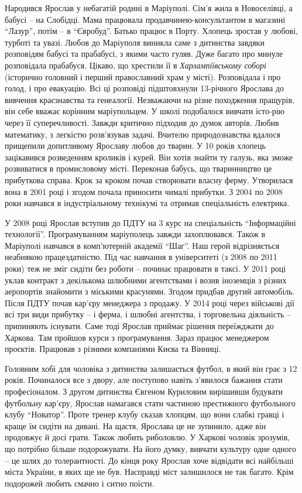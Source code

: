Народився Ярослав у небагатій родині в Маріуполі. Сім'я жила в Новоселівці, а
бабусі – на Слобідці. Мама працювала продавчинею-консультантом в магазині
\enquote{Лазур}, потім – в \enquote{Євробуд}. Батько працює в Порту. Хлопець зростав у любові,
турботі та увазі. Любов до Маріуполя виникла саме з дитинства завдяки
розповідям бабусі та прабабусі, з якими часто гуляв. Дуже багато про минуле
розповідала прабабуся. Цікаво, що хрестили її в \emph{Харлампіївському соборі}
(історично головний і перший  православний храм у місті). Розповідала і про
голод, і про евакуацію.  Всі ці розповіді підштовхнули 13-річного Ярослава до
вивчення краєзнавства та генеалогії. Незважаючи на різне походження пращурів,
він себе вважає корінним маріупольцем.  У школі подобалося вивчати істо\hyp{}рію
через її суперечливості. Завжди критично підходив до думок авторів. Любив
математику, з легкістю розв'язував задачі. Вчителю природознавства вдалося
прищепили допитливому Ярославу  любов до тварин. У 10 років хлопець зацікавився
розведенням кроликів і курей. Він хотів знайти ту галузь, яка зможе розвиватися
в промисловому місті. Переконав бабусь, що тваринництво це прибуткова справа.
Крок за кроком почав створювати власну ферму. Утворилася вона в 2001 році і
згодом почала приносити чималі прибутки. З 2004 по 2008 роки навчався в
індустріальному технікумі та отримав спеціальність електрика.

У 2008 році Ярослав вступив до ПДТУ на 3 курс на спеціальність \enquote{Інформаційні
технології}. Програмуванням маріуполець завжди захоплювався. Також в Маріуполі
навчався в комп'ютерній академії \enquote{Шаг}. Наш герой відрізняється неабиякою
працездатністю. Під час навчання в  університеті (з 2008 по 2011 роки) теж не
зміг сидіти без роботи – починає працювати в таксі. У 2011 році уклав контракт
з декількома шлюбними агентствами і возив іноземців з різних аеропортів
знайомити з міськими красунями. Згодом придбав другий   автомобіль. Після ПДТУ
почав кар'єру менеджера з продажу. У 2014 році через військові дії всі три види
прибутку – і ферма, і шлюбні агентства, і торговельна діяльність – припиняють
існувати. Саме тоді Ярослав приймає рішення переїжджати до Харкова. Там пройшов
курси з програмування. Зараз працює менеджером проєктів. Працював з різними
компаніями Києва та Вінниці.

Головним хобі для чоловіка з дитинства залишається футбол, в який він грає з 12
років. Починалося все з двору, але поступово навіть з'явилося бажання стати
професіоналом. З другом дитинства Євгеном Куриловим вирішивши будувати
футбольну кар'єру, Ярослав намагався стати частиною престижного футбольного
клубу \enquote{Новатор}. Проте тренер клубу сказав хлопцям, що вони  слабкі гравці і
краще їм сидіти на дивані. На щастя, Ярослава це не зупинило, адже він
продовжує й досі грати. Також любить риболовлю. У Харкові чоловік зрозумів, що
потрібно більше подорожувати. На його думку, вивчати культуру одне одного – це
шлях до толерантності. До кінця року Ярослав  хоче відвідати всі найбільші
міста України, в яких ще не був. Насправді міст залишилося не так багато. Крім
подорожей любить смачно і ситно поїсти.

